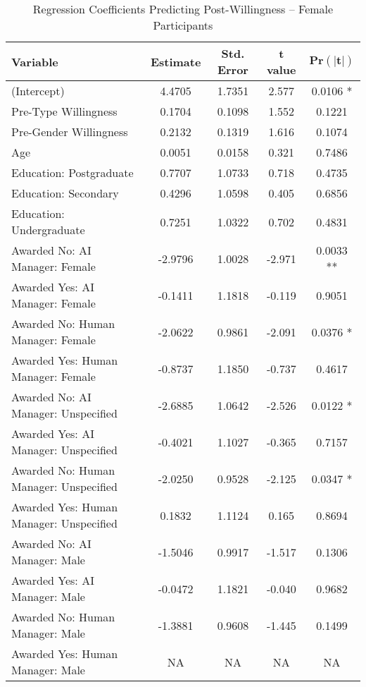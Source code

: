 \begin{table}[ht]
    \centering
    \caption{Regression Coefficients Predicting Post-Willingness -- Female Participants}
    \begin{tabular}{lcccc}
        \toprule
        \textbf{Variable} & \textbf{Estimate} & \textbf{Std. Error} & \textbf{t value} & 
        $\mathbf{\text{Pr}(|t|)}$
        \\
        \midrule
        (Intercept) & 4.4705  & 1.7351  & 2.577  & 0.0106 *  \\
        Pre-Type Willingness & 0.1704  & 0.1098  & 1.552  & 0.1221  \\
        Pre-Gender Willingness & 0.2132  & 0.1319  & 1.616  & 0.1074  \\
        Age & 0.0051  & 0.0158  & 0.321  & 0.7486  \\
        Education: Postgraduate & 0.7707  & 1.0733  & 0.718  & 0.4735  \\
        Education: Secondary & 0.4296  & 1.0598  & 0.405  & 0.6856  \\
        Education: Undergraduate & 0.7251  & 1.0322  & 0.702  & 0.4831  \\
        Awarded No: AI Manager: Female & -2.9796  & 1.0028  & -2.971  & 0.0033 **  \\
        Awarded Yes: AI Manager: Female & -0.1411  & 1.1818  & -0.119  & 0.9051  \\
        Awarded No: Human Manager: Female & -2.0622  & 0.9861  & -2.091  & 0.0376 *  \\
        Awarded Yes: Human Manager: Female & -0.8737  & 1.1850  & -0.737  & 0.4617  \\
        Awarded No: AI Manager: Unspecified & -2.6885  & 1.0642  & -2.526  & 0.0122 *  \\
        Awarded Yes: AI Manager: Unspecified & -0.4021  & 1.1027  & -0.365  & 0.7157  \\
        Awarded No: Human Manager: Unspecified & -2.0250  & 0.9528  & -2.125  & 0.0347 *  \\
        Awarded Yes: Human Manager: Unspecified & 0.1832  & 1.1124  & 0.165  & 0.8694  \\
        Awarded No: AI Manager: Male & -1.5046  & 0.9917  & -1.517  & 0.1306  \\
        Awarded Yes: AI Manager: Male & -0.0472  & 1.1821  & -0.040  & 0.9682  \\
        Awarded No: Human Manager: Male & -1.3881  & 0.9608  & -1.445  & 0.1499  \\
        Awarded Yes: Human Manager: Male & NA  & NA  & NA  & NA  \\

\end{tabular}
\end{table}
